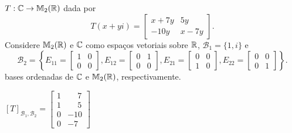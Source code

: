 \documentclass[12pt]{exam}
\begin{document}
\begin{exercicio}
    $T : \mathbb{C} \to \mathbb{M}_2(\mathbb{R})$ dada por
    \[
    T(x + yi) = \begin{bmatrix}
        x + 7y & 5y\\
        -10y & x - 7y
    \end{bmatrix}.
    \]
    Considere $\mathbb{M}_2(\mathbb{R})$ e $\mathbb{C}$ como espaços vetoriais sobre $\mathbb{R}$,  $\mathcal{B}_1 = \{1, i\}$ e
    \[
    \mathcal{B}_2 = \left\{E_{11} = \begin{bmatrix}
        1 & 0\\0 & 0
    \end{bmatrix}, E_{12} = \begin{bmatrix}
        0 & 1\\0 & 0
    \end{bmatrix}, E_{21} = \begin{bmatrix}
        0 & 0\\1 & 0
    \end{bmatrix}, E_{22} = \begin{bmatrix}
        0 & 0\\0 & 1
    \end{bmatrix}\right\}.
    \]
    bases ordenadas de $\mathbb{C}$ e $\mathbb{M}_2(\mathbb{R})$, respectivamente.

    \begin{solucao}
        $[T]_{\mathcal{B}_1, \mathcal{B}_2} = \begin{bmatrix}
            1 & \phantom{-}7\\
            1 & \phantom{-}5\\
            0 & -10\\
            0 & -7
        \end{bmatrix}$
    \end{solucao}
\end{exercicio}
\end{document}
